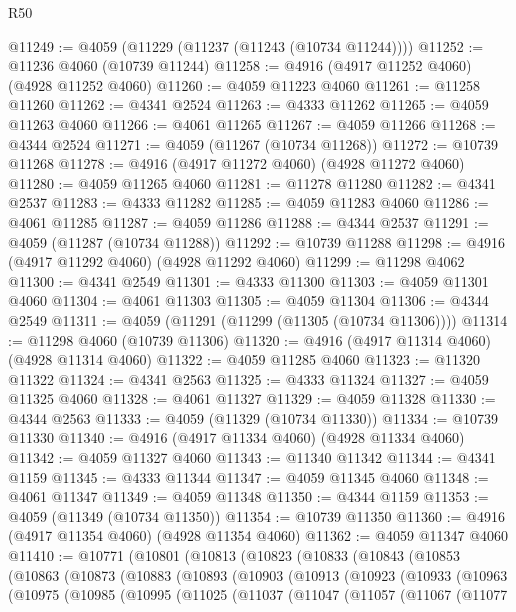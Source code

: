 \begin{lexlean}{R50}
\begin{coremodule}
@11249 := @4059 (@11229 (@11237 (@11243 (@10734 @11244))))
@11252 := @11236 @4060 (@10739 @11244)
@11258 := @4916 (@4917 @11252 @4060) (@4928 @11252 @4060)
@11260 := @4059 @11223 @4060
@11261 := @11258 @11260
@11262 := @4341 @2524
@11263 := @4333 @11262
@11265 := @4059 @11263 @4060
@11266 := @4061 @11265
@11267 := @4059 @11266
@11268 := @4344 @2524
@11271 := @4059 (@11267 (@10734 @11268))
@11272 := @10739 @11268
@11278 := @4916 (@4917 @11272 @4060) (@4928 @11272 @4060)
@11280 := @4059 @11265 @4060
@11281 := @11278 @11280
@11282 := @4341 @2537
@11283 := @4333 @11282
@11285 := @4059 @11283 @4060
@11286 := @4061 @11285
@11287 := @4059 @11286
@11288 := @4344 @2537
@11291 := @4059 (@11287 (@10734 @11288))
@11292 := @10739 @11288
@11298 := @4916 (@4917 @11292 @4060) (@4928 @11292 @4060)
@11299 := @11298 @4062
@11300 := @4341 @2549
@11301 := @4333 @11300
@11303 := @4059 @11301 @4060
@11304 := @4061 @11303
@11305 := @4059 @11304
@11306 := @4344 @2549
@11311 := @4059 (@11291 (@11299 (@11305 (@10734 @11306))))
@11314 := @11298 @4060 (@10739 @11306)
@11320 := @4916 (@4917 @11314 @4060) (@4928 @11314 @4060)
@11322 := @4059 @11285 @4060
@11323 := @11320 @11322
@11324 := @4341 @2563
@11325 := @4333 @11324
@11327 := @4059 @11325 @4060
@11328 := @4061 @11327
@11329 := @4059 @11328
@11330 := @4344 @2563
@11333 := @4059 (@11329 (@10734 @11330))
@11334 := @10739 @11330
@11340 := @4916 (@4917 @11334 @4060) (@4928 @11334 @4060)
@11342 := @4059 @11327 @4060
@11343 := @11340 @11342
@11344 := @4341 @1159
@11345 := @4333 @11344
@11347 := @4059 @11345 @4060
@11348 := @4061 @11347
@11349 := @4059 @11348
@11350 := @4344 @1159
@11353 := @4059 (@11349 (@10734 @11350))
@11354 := @10739 @11350
@11360 := @4916 (@4917 @11354 @4060) (@4928 @11354 @4060)
@11362 := @4059 @11347 @4060
@11410 := @10771
    (@10801
      (@10813
        (@10823
          (@10833
            (@10843
              (@10853
                (@10863
                  (@10873
                    (@10883
                      (@10893
                        (@10903
                          (@10913
                            (@10923
                              (@10933
                                (@10963
                                  (@10975
                                    (@10985
                                      (@10995
                                        (@11025
                                          (@11037
                                            (@11047
                                              (@11057
                                                (@11067
                                                  (@11077

\end{coremodule}
\end{lexlean}
